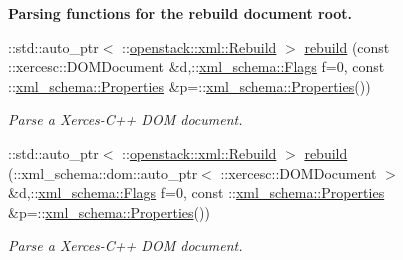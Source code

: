 \begin{Indent}{\bf Parsing functions for the rebuild document root.}
\begin{DoxyCompactItemize}
::std::auto\_\-ptr$<$ ::\hyperlink{classopenstack_1_1xml_1_1Rebuild}{openstack::xml::Rebuild} $>$ \hyperlink{namespaceopenstack_1_1xml_a5a52efe1dd913f94975ab945721f379b}{rebuild} (const ::xercesc::DOMDocument \&d,::\hyperlink{namespacexml__schema_affb4c227cbd9aa7453dd1dc5a1401943}{xml\_\-schema::Flags} f=0, const ::\hyperlink{namespacexml__schema_ad27ce19a7ee1d3b1064092648898f64c}{xml\_\-schema::Properties} \&p=::\hyperlink{namespacexml__schema_ad27ce19a7ee1d3b1064092648898f64c}{xml\_\-schema::Properties}())
\begin{DoxyCompactList}\small\item\em Parse a Xerces-\/C++ DOM document. \item\end{DoxyCompactList}\item 
::std::auto\_\-ptr$<$ ::\hyperlink{classopenstack_1_1xml_1_1Rebuild}{openstack::xml::Rebuild} $>$ \hyperlink{namespaceopenstack_1_1xml_aff61590a78180b4e53bec2e2a1e8f6fd}{rebuild} (::xml\_\-schema::dom::auto\_\-ptr$<$ ::xercesc::DOMDocument $>$ \&d,::\hyperlink{namespacexml__schema_affb4c227cbd9aa7453dd1dc5a1401943}{xml\_\-schema::Flags} f=0, const ::\hyperlink{namespacexml__schema_ad27ce19a7ee1d3b1064092648898f64c}{xml\_\-schema::Properties} \&p=::\hyperlink{namespacexml__schema_ad27ce19a7ee1d3b1064092648898f64c}{xml\_\-schema::Properties}())
\begin{DoxyCompactList}\small\item\em Parse a Xerces-\/C++ DOM document. \item\end{DoxyCompactList}\end{DoxyCompactItemize}
\end{Indent}
